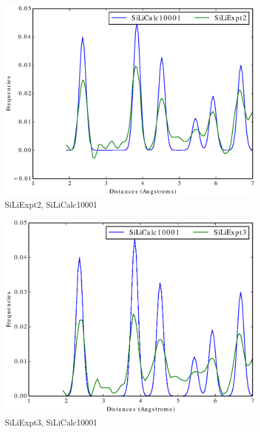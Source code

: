\documentclass[12pt,letterpaper]{article}
\begin{document}
\begin{figure}[ht]
  \begin{center}
    \includegraphics[scale=0.8]{figs/SparseRepSiLiExpt2-SiLiCalc10001.eps}
    \caption{SiLiExpt2, SiLiCalc10001}
  \end{center}
\end{figure}

\begin{figure}[ht]
  \begin{center}
    \includegraphics[scale=0.8]{figs/SparseRepSiLiExpt3-SiLiCalc10001.eps}
    \caption{SiLiExpt3, SiLiCalc10001}
  \end{center}
\end{figure}
\end{document}
